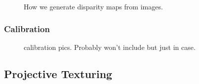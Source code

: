 \documentclass[a4paper,twoside]{article}
\begin{document}
\noindent

\begin{figure*}[!ht]
   \vspace{-0.2cm}
   \caption{How we generate disparity maps from images.}
  \label{fig:dispgen}
 \end{figure*}

\subsubsection{Calibration}
\label{subsec:calibration}


\begin{figure}[!h]
	\centering
		\quad %
		\caption{calibration pics. Probably won't include but just in case.}
		\label{calibrate}
\end{figure}

\noindent 

\subsection{Projective Texturing}



\end{document}
